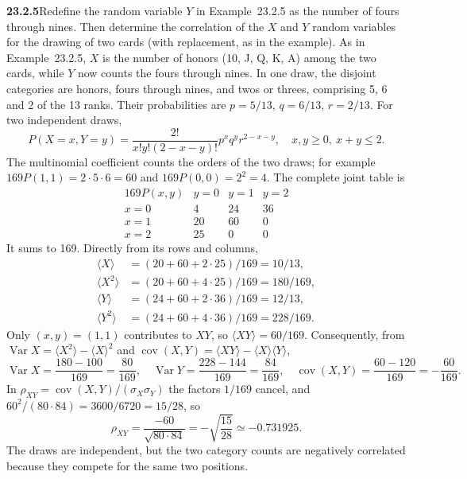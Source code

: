 \par\bigskip
\noindent\textbf{23.2.5}\quad Redefine the random variable $Y$ in
Example~23.2.5 as the number of fours through nines. Then
determine the correlation of the $X$ and $Y$ random variables
for the drawing of two cards (with replacement, as in the
example).
\solution
As in Example~23.2.5, $X$ is the number of honors (10, J, Q, K, A)
among the two cards, while $Y$ now counts the fours through nines.
In one draw, the disjoint categories are honors,
fours through nines, and twos or threes, comprising 5, 6 and 2 of the
13 ranks. Their probabilities are $p=5/13$, $q=6/13$, $r=2/13$. For
two independent draws,
\[
P(X=x,Y=y)=\frac{2!}{x!y!(2-x-y)!}p^xq^yr^{2-x-y},
\quad x,y\ge0,\ x+y\le2.
\]
The multinomial coefficient counts the orders of the two draws; for
example $169P(1,1)=2\cdot5\cdot6=60$ and $169P(0,0)=2^2=4$.
The complete joint table is
\[
\begin{array}{c|rrr}
169P(x,y)&y=0&y=1&y=2\\\hline
x=0&4&24&36\\
x=1&20&60&0\\
x=2&25&0&0
\end{array}
\]
It sums to 169. Directly from its rows and columns,
\begin{align*}
\langle X\rangle&=(20+60+2\cdot25)/169=10/13,\\
\langle X^2\rangle&=(20+60+4\cdot25)/169=180/169,\\
\langle Y\rangle&=(24+60+2\cdot36)/169=12/13,\\
\langle Y^2\rangle&=(24+60+4\cdot36)/169=228/169.
\end{align*}
Only $(x,y)=(1,1)$ contributes to $XY$, so $\langle XY\rangle=60/169$.
Consequently, from $\operatorname{Var}X=\langle X^2\rangle-\langle X\rangle^2$
and $\operatorname{cov}(X,Y)=\langle XY\rangle-\langle X\rangle\langle Y\rangle$,
\[
\operatorname{Var}X=\frac{180-100}{169}=\frac{80}{169},\quad
\operatorname{Var}Y=\frac{228-144}{169}=\frac{84}{169},\quad
\operatorname{cov}(X,Y)=\frac{60-120}{169}=-\frac{60}{169}.
\]
In $\rho_{XY}=\operatorname{cov}(X,Y)/(\sigma_X\sigma_Y)$ the factors
$1/169$ cancel, and $60^2/(80\cdot84)=3600/6720=15/28$, so
\[
\boxed{\rho_{XY}=\frac{-60}{\sqrt{80\cdot84}}
=-\sqrt{\frac{15}{28}}\simeq-0.731925}.
\]
The draws are independent, but the two category counts are negatively
correlated because they compete for the same two positions.



